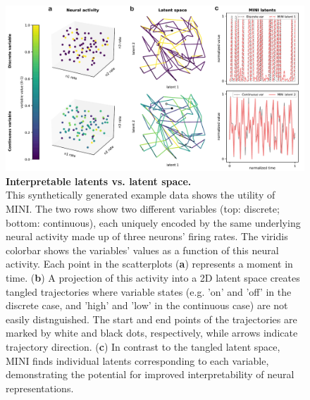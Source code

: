 \begin{figure}[h]
    \centering
    \includegraphics[width=\linewidth]{figures/interpretable_latents_vs_latent_space.pdf}
    \caption{
        \textbf{Interpretable latents vs. latent space.} \\
        \small This synthetically generated example data shows the utility of MINI. The two rows show two different variables (top: discrete; bottom: continuous), each uniquely encoded by the same underlying neural activity made up of three neurons' firing rates. The viridis colorbar shows the variables' values as a function of this neural activity. Each point in the scatterplots (\textbf{a}) represents a moment in time. (\textbf{b}) A projection of this activity into a 2D latent space creates tangled trajectories where variable states (e.g. 'on' and 'off' in the discrete case, and 'high' and 'low' in the continuous case) are not easily distnguished. The start and end points of the trajectories are marked by white and black dots, respectively, while arrows indicate trajectory direction. (\textbf{c}) In contrast to the tangled latent space, MINI finds individual latents corresponding to each variable, demonstrating the potential for improved interpretability of neural representations.
    }
    \label{fig:interpretable_latents_vs_latent_space}
\end{figure}
